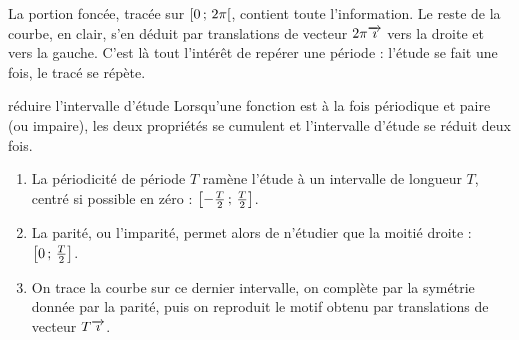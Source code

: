 \begin{visualisation}
\begin{center}
\end{center}

\vspace{0.2em}
\noindent
La portion foncée, tracée sur $\left[0\,;\,2\pi\right[$, contient toute
l'information. Le reste de la courbe, en clair, s'en déduit par translations
de vecteur $2\pi\overrightarrow{\imath}$ vers la droite et vers la gauche. C'est là tout
l'intérêt de repérer une période : l'étude se fait une fois, le tracé se
répète.
\end{visualisation}

\begin{methode}{réduire l'intervalle d'étude}
Lorsqu'une fonction est à la fois périodique et paire (ou impaire), les deux
propriétés se cumulent et l'intervalle d'étude se réduit deux fois.
\begin{enumerate}[label=\textbf{\arabic*.}, leftmargin=1.6em, itemsep=0.2em]
  \item La périodicité de période $T$ ramène l'étude à un intervalle de
        longueur $T$, centré si possible en zéro :
        $\left[-\frac{T}{2}\,;\,\frac{T}{2}\right]$.
  \item La parité, ou l'imparité, permet alors de n'étudier que la moitié
        droite : $\left[0\,;\,\frac{T}{2}\right]$.
  \item On trace la courbe sur ce dernier intervalle, on complète par la
        symétrie donnée par la parité, puis on reproduit le motif obtenu par
        translations de vecteur $T\overrightarrow{\imath}$.
\end{enumerate}
\end{methode}

